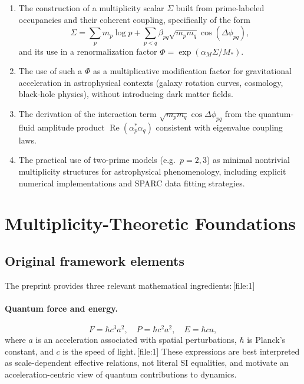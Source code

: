 \documentclass[11pt]{article}
\begin{document}
\begin{enumerate}
\item The construction of a multiplicity scalar \(\Sigma\) built from prime-labeled occupancies and their coherent coupling, specifically of the form
\[
\Sigma = \sum_p m_p \log p + \sum_{p<q}\beta_{pq}\sqrt{m_p m_q}\cos(\Delta\phi_{pq}),
\]
and its use in a renormalization factor \(\Phi = \exp(\alpha_M\Sigma/M_*)\).
\item The use of such a \(\Phi\) as a multiplicative modification factor for gravitational acceleration in astrophysical contexts (galaxy rotation curves, cosmology, black-hole physics), without introducing dark matter fields.
\item The derivation of the interaction term \(\sqrt{m_p m_q}\cos\Delta\phi_{pq}\) from the quantum-fluid amplitude product \(\operatorname{Re}(\alpha_p^* \alpha_q)\) consistent with eigenvalue coupling laws.
\item The practical use of two-prime models (e.g.\ \(p=2,3\)) as minimal nontrivial multiplicity structures for astrophysical phenomenology, including explicit numerical implementations and SPARC data fitting strategies.
\end{enumerate}

\section{Multiplicity-Theoretic Foundations}

\subsection{Original framework elements}

The preprint provides three relevant mathematical ingredients:\,[file:1]

\paragraph{Quantum force and energy.}
\begin{equation}
F = \hbar c^3 a^2,\quad P = \hbar c^2 a^2,\quad E = \hbar c a,
\label{eq:force-energy}
\end{equation}
where \(a\) is an acceleration associated with spatial perturbations, \(\hbar\) is Planck's constant, and \(c\) is the speed of light.\,[file:1]
These expressions are best interpreted as scale-dependent effective relations, not literal SI equalities, and motivate an acceleration-centric view of quantum contributions to dynamics.
\end{document}
